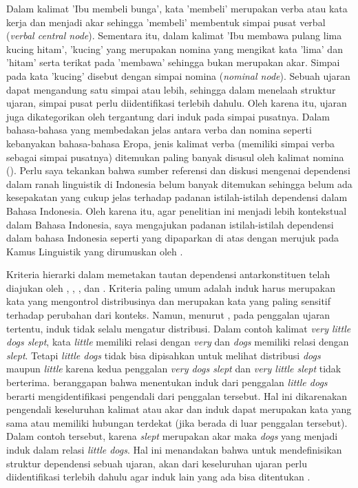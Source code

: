 Dalam kalimat 'Ibu membeli bunga', kata 'membeli' merupakan verba atau kata kerja dan menjadi akar sehingga 'membeli' membentuk simpai pusat verbal (\textit{verbal central node}). Sementara itu, dalam kalimat 'Ibu membawa pulang lima kucing hitam', 'kucing' yang merupakan nomina yang mengikat kata 'lima' dan 'hitam' serta terikat pada 'membawa' sehingga bukan merupakan akar. Simpai pada kata 'kucing' disebut dengan simpai nomina (\textit{nominal node}). Sebuah ujaran dapat mengandung satu simpai atau lebih, sehingga dalam menelaah struktur ujaran, simpai pusat perlu diidentifikasi terlebih dahulu. Oleh karena itu, ujaran juga dikategorikan oleh \cite{tesniere1959elements} tergantung dari induk pada simpai pusatnya. Dalam bahasa-bahasa yang membedakan jelas antara verba dan nomina seperti kebanyakan bahasa-bahasa Eropa, jenis kalimat verba (memiliki simpai verba sebagai simpai pusatnya) ditemukan paling banyak disusul oleh kalimat nomina (\citealp{tesniere1959elements, hudson2007language}). Perlu saya tekankan bahwa sumber referensi dan diskusi mengenai dependensi dalam ranah linguistik di Indonesia belum banyak ditemukan sehingga belum ada kesepakatan yang cukup jelas terhadap padanan istilah-istilah dependensi dalam Bahasa Indonesia. Oleh karena itu, agar penelitian ini menjadi lebih kontekstual dalam Bahasa Indonesia, saya mengajukan padanan istilah-istilah dependensi dalam bahasa Indonesia seperti yang dipaparkan di atas dengan merujuk pada Kamus Linguistik yang dirumuskan oleh \cite{kridalaksana2008kamus}.

Kriteria hierarki dalam memetakan tautan dependensi antarkonstituen telah diajukan oleh \cite{bloomfield1933language}, \cite{zwicky1985heads}, \cite{garde1977ordre}, dan \cite{mel'vcuk1988dependency}. Kriteria paling umum adalah induk harus merupakan kata yang mengontrol distribusinya dan merupakan kata yang paling sensitif terhadap perubahan dari konteks. Namun, menurut \cite{gerdes2013defining}, pada penggalan ujaran tertentu, induk tidak selalu mengatur distribusi. Dalam contoh kalimat \textit{very little dogs slept}, kata \textit{little} memiliki relasi dengan \textit{very} dan \textit{dogs} memiliki relasi dengan \textit{slept}. Tetapi \textit{little dogs} tidak bisa dipisahkan untuk melihat distribusi \textit{dogs} maupun \textit{little} karena kedua penggalan \textit{very dogs slept} dan \textit{very little slept} tidak berterima. \cite{gerdes2013defining} beranggapan bahwa menentukan induk dari penggalan \textit{little dogs} berarti mengidentifikasi pengendali dari penggalan tersebut. Hal ini  dikarenakan pengendali keseluruhan kalimat atau akar dan induk dapat merupakan kata yang sama atau memiliki hubungan terdekat (jika berada di luar penggalan tersebut). Dalam contoh tersebut, karena \textit{slept} merupakan akar maka \textit{dogs} yang menjadi induk dalam relasi \textit{little dogs}. Hal ini menandakan bahwa untuk mendefinisikan struktur dependensi sebuah ujaran, akan dari keseluruhan ujaran perlu diidentifikasi terlebih dahulu agar induk lain yang ada bisa ditentukan \citep{gerdes2013defining}. 


